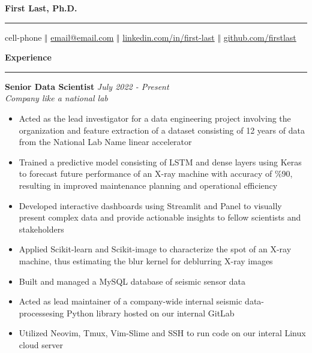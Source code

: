 \documentclass[11pt]{article}
\begin{document}
\thispagestyle{empty}

\begin{center}
  \bf \Huge  First Last, Ph.D.
  \vspace{.1em}
  \hrule
\end{center}

\begin{center}
  \vspace{.4em}
  cell-phone $\Big \Vert$
  \href{mailto:email@email.com}{email@email.com} $\Big \Vert$ 
  \href{https://www.linkedin.com/in/first-last/}{linkedin.com/in/first-last} $\Big \Vert$
  \href{https://github.com/firstlast}{github.com/firstlast}
\end{center}

\textbf{\Large Experience}
\vspace{.3em}
\hrule
\vspace{.3em}

\textbf{\large Senior Data Scientist} \hfill \textit{July 2022 - Present}\\
\textit{Company like a national lab} 

\begin{itemize} \setlength\itemsep{-0.5em}
  \item Acted as the lead investigator for a data engineering project involving
  the organization and feature extraction of a dataset consisting of
  12 years of data from the National Lab Name linear accelerator
  \item Trained a predictive model consisting of LSTM and dense layers using Keras to forecast
  future performance of an X-ray machine with accuracy of \%90, resulting in improved maintenance
  planning and operational efficiency
  \item Developed interactive dashboards using Streamlit and Panel to
  visually present complex data and provide actionable insights to
  fellow scientists and stakeholders
  \item Applied Scikit-learn and Scikit-image to characterize the spot of an
  X-ray machine, thus estimating the blur kernel for deblurring X-ray
  images
  \item Built and managed a MySQL database of seismic sensor data
  \item Acted as lead maintainer of a company-wide internal seismic data-processesing Python library
  hosted on our internal GitLab
  \item Utilized Neovim, Tmux, Vim-Slime and SSH to
  run code on our interal Linux cloud server
\end{itemize}
\end{document}
